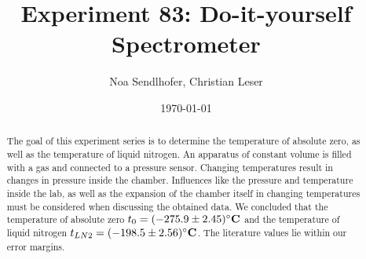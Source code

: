 \documentclass[12pt,a4paper]{article}
\title{Experiment 83: Do-it-yourself Spectrometer}
\author{Noa Sendlhofer, Christian Leser}
\date{\today}
\begin{document}
\maketitle

\begin{abstract}
    The goal of this experiment series is to determine the temperature of absolute zero, 
    as well as the temperature of liquid nitrogen. An apparatus of constant volume is filled with a gas
    and connected to a pressure sensor. Changing temperatures result in changes in pressure inside the chamber.
    Influences like the pressure and temperature inside the lab, as well as the expansion of the chamber itself
    in changing temperatures must be considered when discussing the obtained data. We concluded that the temperature
    of absolute zero $t_0 = (-275.9 \pm 2.45)\si{\bf\celsius}$ and the temperature of liquid nitrogen $t_{LN2} = (-198.5 \pm 2.56)\si{\bf\celsius}$.
    The literature values lie within our error margins.

\end{abstract}

\tableofcontents

\newpage



\newpage




\newpage


\end{document}
